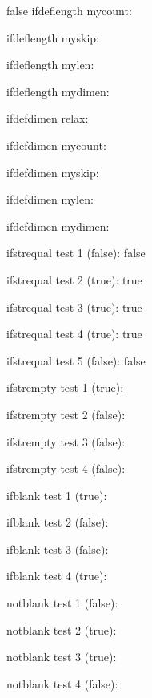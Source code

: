 \documentclass{article}
\begin{document}
\begin{true}{false}
ifdeflength mycount: 

ifdeflength myskip: 

ifdeflength mylen: 

ifdeflength mydimen: 

ifdefdimen relax: 

ifdefdimen mycount: 

ifdefdimen myskip: 

ifdefdimen mylen: 

ifdefdimen mydimen: 


ifstrequal test 1 (false): \ifstrequal{my\relaxing}{\myrelaxing}{true}{false}

ifstrequal test 2 (true): \ifstrequal{my\relaxing}{my\relaxing}{true}{false}

ifstrequal test 3 (true): \ifstrequal{\myrelaxing}{\myrelaxing}{true}{false}

ifstrequal test 4 (true): \ifstrequal{simple}{simple}{true}{false}

ifstrequal test 5 (false): \ifstrequal{simple}{simpler}{true}{false}

ifstrempty test 1 (true): 

ifstrempty test 2 (false): 

ifstrempty test 3 (false): 

ifstrempty test 4 (false): 

ifblank test 1 (true): 

ifblank test 2 (false): 

ifblank test 3 (false): 

ifblank test 4 (true): 

notblank test 1 (false): 

notblank test 2 (true): 

notblank test 3 (true): 

notblank test 4 (false): 


\end{true}
\end{document}

